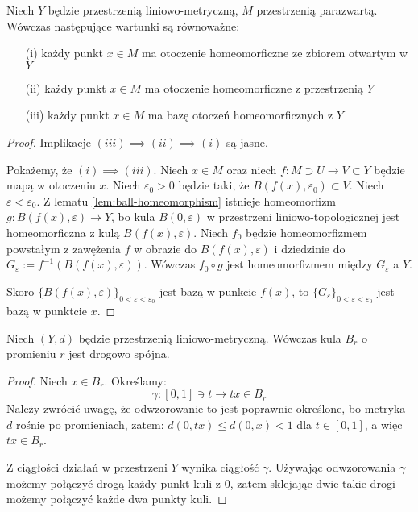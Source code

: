 \begin{lem}
  Niech $Y$ będzie przestrzenią liniowo-metryczną, $M$ przestrzenią parazwartą. Wówczas następujące wartunki są równoważne:
  \begin{enumerate}
   \item[(i)] każdy punkt $x \in M$ ma otoczenie homeomorficzne ze zbiorem otwartym w $Y$
   \item[(ii)] każdy punkt $x \in M$ ma otoczenie homeomorficzne z przestrzenią $Y$
   \item[(iii)] każdy punkt $x \in M$ ma bazę otoczeń homeomorficznych z $Y$
  \end{enumerate}

  \begin{proof}
    Implikacje $(iii) \implies (ii) \implies (i)$ są jasne.
    
    Pokażemy, że $(i) \implies (iii)$. Niech $x \in M$ oraz niech $f: M \supset U \to V \subset Y$ będzie mapą w otoczeniu $x$. Niech $\varepsilon_0 > 0$ będzie taki, że $B(f(x), \varepsilon_0) \subset V$. Niech $\varepsilon < \varepsilon_0$. Z lematu \ref{lem:ball-homeomorphism} istnieje homeomorfizm $g: B(f(x), \varepsilon) \to Y$, bo kula $B(0, \varepsilon)$ w przestrzeni liniowo-topologicznej jest homeomorficzna z kulą $B(f(x), \varepsilon)$. Niech $f_0$ będzie homeomorfizmem powstałym z zawężenia $f$ w obrazie do $B(f(x), \varepsilon)$ i dziedzinie do $G_\varepsilon := f^{-1}(B(f(x), \varepsilon))$. Wówczas $f_0 \circ g$ jest homeomorfizmem między $G_\varepsilon$ a $Y$.
    
    Skoro $\{B(f(x), \varepsilon)\}_{0 < \varepsilon < \varepsilon_0}$ jest bazą w punkcie $f(x)$, to $\{G_\varepsilon\}_{0 < \varepsilon < \varepsilon_0}$ jest bazą w punktcie $x$.
  \end{proof}
\end{lem}

\begin{lem}
  Niech $(Y, d)$ będzie przestrzenią liniowo-metryczną. Wówczas kula $B_r$ o promieniu $r$ jest drogowo spójna.
  \begin{proof}
    Niech $x \in B_r$. Określamy:
    \[
      \gamma: [0,1] \ni t \to tx \in B_r
    \]
    Należy zwrócić uwagę, że odwzorowanie to jest poprawnie określone, bo metryka $d$ rośnie po promieniach, zatem: $d(0, tx) \leq d(0, x) < 1$ dla $t \in [0,1]$, a więc $tx \in B_r$.
    
    Z ciągłości działań w przestrzeni $Y$ wynika ciągłość $\gamma$. Używając odwzorowania $\gamma$ możemy połączyć drogą każdy punkt kuli z $0$, zatem sklejając dwie takie drogi możemy połączyć każde dwa punkty kuli.
  \end{proof}
\end{lem}

